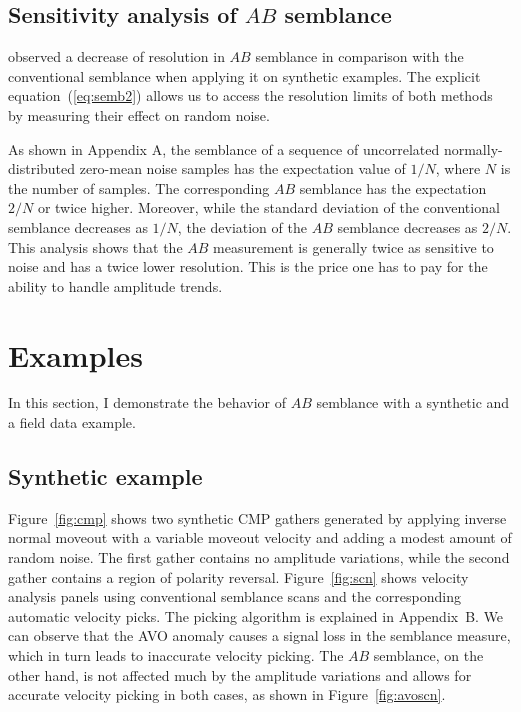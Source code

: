 \subsection{Sensitivity analysis of $AB$ semblance}

\cite{GEO66-04-12841293,GEO67-05-16641672} observed a decrease of resolution 
in $AB$ semblance in comparison with the conventional
semblance when applying it on synthetic examples. The explicit
equation~(\ref{eq:semb2}) allows us to access the resolution limits of
both methods by measuring their effect on random noise.

As shown in Appendix A, the semblance of a sequence of uncorrelated
normally-distributed zero-mean noise samples has the expectation value
of $1/N$, where $N$ is the number of samples. The corresponding
$AB$ semblance has the expectation $2/N$ or twice
higher. Moreover, while the standard deviation of the conventional
semblance decreases as $1/N$, the deviation of the $AB$
semblance decreases as $2/N$. This analysis shows that the
$AB$ measurement is generally twice as sensitive to noise
and has a twice lower resolution. This is the price one has to pay for
the ability to handle amplitude trends.

\section{Examples}

In this section, I demonstrate the behavior of $AB$ semblance
with a synthetic and a field data example.

\subsection{Synthetic example} 



Figure~\ref{fig:cmp} shows two synthetic CMP gathers generated by
applying inverse normal moveout with a variable moveout velocity and
adding a modest amount of random noise. The first gather contains no
amplitude variations, while the second gather contains a region of
polarity reversal. Figure~\ref{fig:scn} shows velocity analysis panels
using conventional semblance scans and the corresponding automatic
velocity picks. The picking algorithm is explained in Appendix~B. We
can observe that the AVO anomaly causes a signal loss in the semblance
measure, which in turn leads to inaccurate velocity picking. The $AB$
semblance, on the other hand, is not affected much by the amplitude
variations and allows for accurate velocity picking in both cases, as
shown in Figure~\ref{fig:avoscn}.


